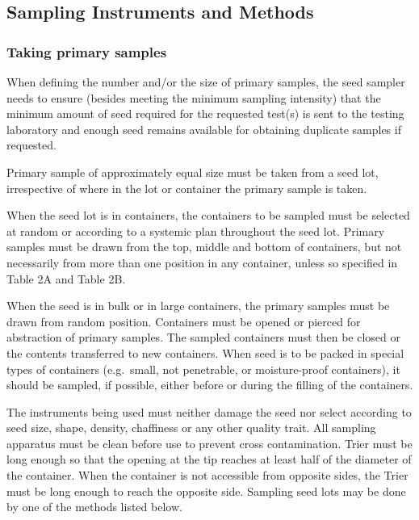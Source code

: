 \documentclass[
]{book}
\begin{document}
\hypertarget{sampling-instruments-and-methods}{%
\subsection{Sampling Instruments and Methods}\label{sampling-instruments-and-methods}}

\hypertarget{taking-primary-samples}{%
\subsubsection{Taking primary samples}\label{taking-primary-samples}}

When defining the number and/or the size of primary samples, the seed sampler needs to ensure (besides meeting the minimum sampling intensity) that the minimum amount of seed required for the requested test(s) is sent to the testing laboratory and enough seed remains available for obtaining duplicate samples if requested.

Primary sample of approximately equal size must be taken from a seed lot, irrespective of where in the lot or container the primary sample is taken.

When the seed lot is in containers, the containers to be sampled must be selected at random or according to a systemic plan throughout the seed lot. Primary samples must be drawn from the top, middle and bottom of containers, but not necessarily from more than one position in any container, unless so specified in Table 2A and Table 2B.

When the seed is in bulk or in large containers, the primary samples must be drawn from random position. Containers must be opened or pierced for abstraction of primary samples. The sampled containers must then be closed or the contents transferred to new containers. When seed is to be packed in special types of containers (e.g.~small, not penetrable, or moisture-proof containers), it should be sampled, if possible, either before or during the filling of the containers.

The instruments being used must neither damage the seed nor select according to seed size, shape, density, chaffiness or any other quality trait. All sampling apparatus must be clean before use to prevent cross contamination. Trier must be long enough so that the opening at the tip reaches at least half of the diameter of the container. When the container is not accessible from opposite sides, the Trier must be long enough to reach the opposite side. Sampling seed lots may be done by one of the methods listed below.
\end{document}
